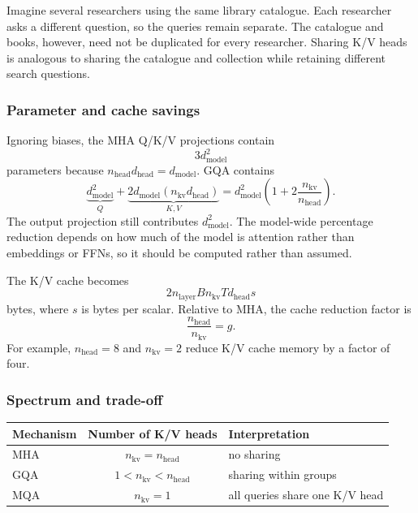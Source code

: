 \documentclass[11pt,a4paper]{article}
\theoremstyle{definition}
\theoremstyle{plain}
\newcommand{\dmodel}{d_{\mathrm{model}}}
\newcommand{\dhead}{d_{\mathrm{head}}}
\newcommand{\nhead}{n_{\mathrm{head}}}
\newcommand{\nlayer}{n_{\mathrm{layer}}}
\begin{document}
\begin{intuitionbox}
Imagine several researchers using the same library catalogue. Each researcher asks a different question, so the queries remain separate. The catalogue and books, however, need not be duplicated for every researcher. Sharing K/V heads is analogous to sharing the catalogue and collection while retaining different search questions.
\end{intuitionbox}

\subsubsection{Parameter and cache savings}

Ignoring biases, the MHA Q/K/V projections contain
\begin{equation}
    3\dmodel^2
\end{equation}
parameters because $\nhead\dhead=\dmodel$. GQA contains
\begin{equation}\label{eq:gqa-qkv-params}
    \underbrace{\dmodel^2}_{Q}
    +\underbrace{2\dmodel(n_{\mathrm{kv}}\dhead)}_{K,V}
    =\dmodel^2\left(1+2\frac{n_{\mathrm{kv}}}{\nhead}\right).
\end{equation}
The output projection still contributes $\dmodel^2$. The model-wide percentage reduction depends on how much of the model is attention rather than embeddings or FFNs, so it should be computed rather than assumed.

The K/V cache becomes
\begin{equation}\label{eq:gqa-cache}
    2\nlayer B n_{\mathrm{kv}}T\dhead s
\end{equation}
bytes, where $s$ is bytes per scalar. Relative to MHA, the cache reduction factor is
\begin{equation}
    \frac{\nhead}{n_{\mathrm{kv}}}=g.
\end{equation}
For example, $\nhead=8$ and $n_{\mathrm{kv}}=2$ reduce K/V cache memory by a factor of four.

\subsubsection{Spectrum and trade-off}

\begin{center}
\begin{tabular}{lcl}
\toprule
Mechanism & Number of K/V heads & Interpretation\\
\midrule
MHA & $n_{\mathrm{kv}}=\nhead$ & no sharing\\
GQA & $1<n_{\mathrm{kv}}<\nhead$ & sharing within groups\\
MQA & $n_{\mathrm{kv}}=1$ & all queries share one K/V head\\
\bottomrule
\end{tabular}
\end{center}
\end{document}
